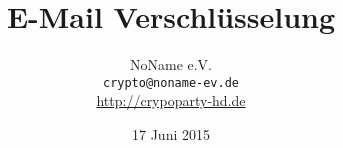 \documentclass[mathserif]{beamer}
\title{E-Mail Verschlüsselung}
\author[NoName e.V.]{NoName e.V. \\ \small{\texttt{crypto@noname-ev.de} } \\ \small{\url{http://crypoparty-hd.de}} }
\institute{NoName e.V.}
\date[17.06.15]{17 Juni 2015}
\begin{document}
\titlepage
\rmfamily %
\tocframe




\blackframe
\end{document}
